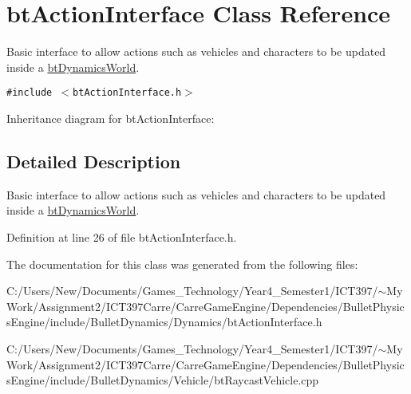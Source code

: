\hypertarget{classbt_action_interface}{
\section{btActionInterface Class Reference}
\label{classbt_action_interface}
}
Basic interface to allow actions such as vehicles and characters to be updated inside a \hyperlink{classbt_dynamics_world}{btDynamicsWorld}.  


{\tt \#include $<$btActionInterface.h$>$}

Inheritance diagram for btActionInterface:

\subsection{Detailed Description}
Basic interface to allow actions such as vehicles and characters to be updated inside a \hyperlink{classbt_dynamics_world}{btDynamicsWorld}. 

Definition at line 26 of file btActionInterface.h.

The documentation for this class was generated from the following files:\begin{CompactItemize}
\item 
C:/Users/New/Documents/Games\_\-Technology/Year4\_\-Semester1/ICT397/$\sim$My Work/Assignment2/ICT397Carre/CarreGameEngine/Dependencies/BulletPhysicsEngine/include/BulletDynamics/Dynamics/btActionInterface.h\item 
C:/Users/New/Documents/Games\_\-Technology/Year4\_\-Semester1/ICT397/$\sim$My Work/Assignment2/ICT397Carre/CarreGameEngine/Dependencies/BulletPhysicsEngine/include/BulletDynamics/Vehicle/btRaycastVehicle.cpp\end{CompactItemize}
